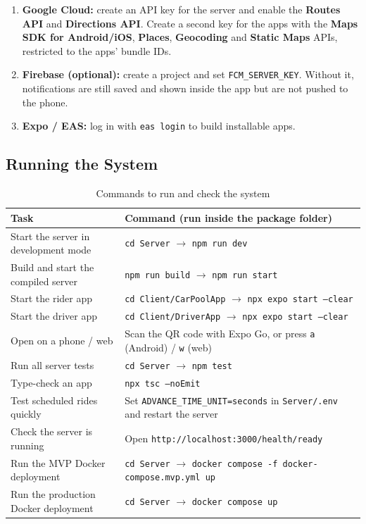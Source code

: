 \begin{enumerate}
  \item \textbf{Google Cloud:} create an API key for the server and enable the
        \textbf{Routes API} and \textbf{Directions API}. Create a second key
        for the apps with the \textbf{Maps SDK for Android/iOS},
        \textbf{Places}, \textbf{Geocoding} and \textbf{Static Maps} APIs,
        restricted to the apps' bundle IDs.
  \item \textbf{Firebase (optional):} create a project and set
        \texttt{FCM\_SERVER\_KEY}. Without it, notifications are still saved
        and shown inside the app but are not pushed to the phone.
  \item \textbf{Expo / EAS:} log in with \texttt{eas login} to build
        installable apps.
\end{enumerate}

\subsection{Running the System}
\label{subsec:running}

\begin{table}[H]
  \centering
  \small
  \caption{Commands to run and check the system}
  \label{tab:run-commands}
  \begin{tabularx}{\textwidth}{@{}p{5cm}L@{}}
    \toprule
    \textbf{Task} & \textbf{Command (run inside the package folder)} \\
    \midrule
    Start the server in development mode & \texttt{cd Server} $\rightarrow$ \texttt{npm run dev} \\
    Build and start the compiled server & \texttt{npm run build} $\rightarrow$ \texttt{npm run start} \\
    Start the rider app & \texttt{cd Client/CarPoolApp} $\rightarrow$ \texttt{npx expo start --clear} \\
    Start the driver app & \texttt{cd Client/DriverApp} $\rightarrow$ \texttt{npx expo start --clear} \\
    Open on a phone / web & Scan the QR code with Expo Go, or press \texttt{a} (Android) / \texttt{w} (web) \\
    Run all server tests & \texttt{cd Server} $\rightarrow$ \texttt{npm test} \\
    Type-check an app & \texttt{npx tsc --noEmit} \\
    Test scheduled rides quickly & Set \texttt{ADVANCE\_TIME\_UNIT=seconds} in \texttt{Server/.env} and restart the server \\
    Check the server is running & Open \texttt{http://localhost:3000/health/ready} \\
    Run the MVP Docker deployment & \texttt{cd Server} $\rightarrow$ \texttt{docker compose -f docker-compose.mvp.yml up} \\
    Run the production Docker deployment & \texttt{cd Server} $\rightarrow$ \texttt{docker compose up} \\
    \bottomrule
  \end{tabularx}
\end{table}

